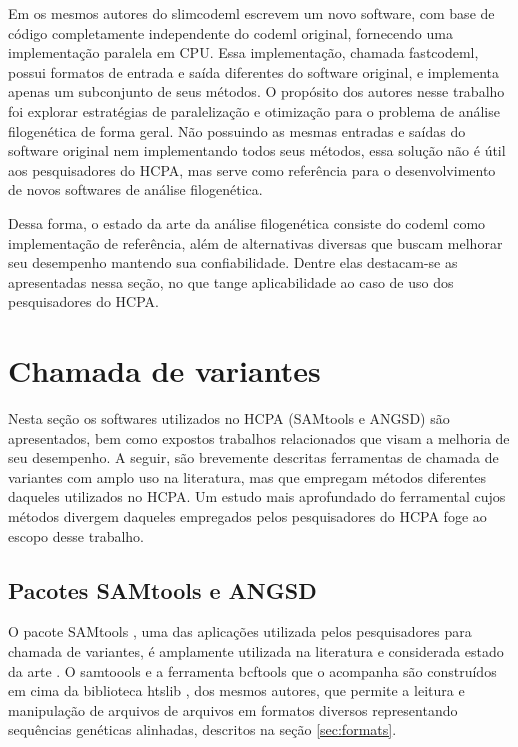 \documentclass[cic,tc]{iiufrgs}
\begin{document}
Em \cite{valle2014optimization} os mesmos autores do slimcodeml escrevem um
novo software, com base de código completamente independente do codeml
original, fornecendo uma implementação paralela em CPU. Essa implementação,
chamada fastcodeml, possui formatos de entrada e saída diferentes do software
original, e implementa apenas um subconjunto de seus métodos. O propósito dos
autores nesse trabalho foi explorar estratégias de paralelização e otimização
para o problema de análise filogenética de forma geral. Não possuindo as mesmas
entradas e saídas do software original nem implementando todos seus métodos,
essa solução não é útil aos pesquisadores do HCPA, mas serve como referência
para o desenvolvimento de novos softwares de análise filogenética.

Dessa forma, o estado da arte da análise filogenética consiste do codeml como
implementação de referência, além de alternativas diversas que buscam melhorar
seu desempenho mantendo sua confiabilidade. Dentre elas destacam-se as
apresentadas nessa seção, no que tange aplicabilidade ao caso de uso dos
pesquisadores do HCPA.

\section{Chamada de variantes}

Nesta seção os softwares utilizados no HCPA (SAMtools e ANGSD) são
apresentados, bem como expostos trabalhos relacionados que visam a melhoria de
seu desempenho. A seguir, são brevemente descritas ferramentas de chamada de
variantes com amplo uso na literatura, mas que empregam métodos diferentes
daqueles utilizados no HCPA. Um estudo mais aprofundado do ferramental cujos
métodos divergem daqueles empregados pelos pesquisadores do HCPA foge ao escopo
desse trabalho.

\subsection{Pacotes SAMtools e ANGSD}

O pacote SAMtools \cite{li2009sequence}, uma das aplicações utilizada pelos
pesquisadores para chamada de variantes, é amplamente utilizada na literatura
\cite{danecek2021twelve} e considerada estado da arte \cite{yao2020evaluation}.
O samtoools e a ferramenta bcftools que o acompanha são construídos em cima da
biblioteca htslib \cite{bonfield2021htslib}, dos mesmos autores, que permite a
leitura e manipulação de arquivos de arquivos em formatos diversos
representando sequências genéticas alinhadas, descritos na seção
\ref{sec:formats}.
\end{document}
